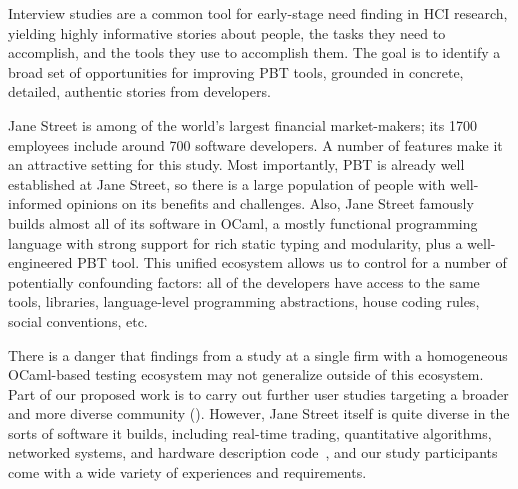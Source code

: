 Interview
studies are a common tool for early-stage need finding in
HCI research, yielding highly informative stories about people, the tasks they need to
accomplish, and the tools they use to accomplish them. The goal
is to identify a broad set of opportunities for improving PBT tools,
grounded in concrete, detailed, authentic stories from developers.

Jane Street is among of the world's largest
financial market-makers; its 1700 employees
include around 700 software developers.  A number of features make
it an attractive setting for this study.  Most importantly, PBT is
already well established at Jane Street, so there is a large
population of people with well-informed opinions on its benefits and
challenges.  Also, Jane Street famously builds almost all of its
software in OCaml, a mostly functional programming language with
strong support for rich static typing and modularity, plus a well-engineered
PBT tool. This unified
ecosystem allows us to control for a number of potentially confounding
factors: all of the developers have access to the same tools,
libraries, language-level programming abstractions, house coding
rules, social conventions, etc.

\iflater
{}%
\fi

There is a danger that findings from a study at a single firm with a homogeneous
OCaml-based testing ecosystem may not generalize outside of this
ecosystem. Part of our proposed work is to carry out further user
studies targeting a broader and more diverse community
().  However, Jane Street itself is quite
diverse in the sorts of software it builds, including real-time
trading, quantitative algorithms, networked systems, and hardware
description code~\cite{signalsandthreads}, and our study participants
come with a wide variety of experiences and requirements.

